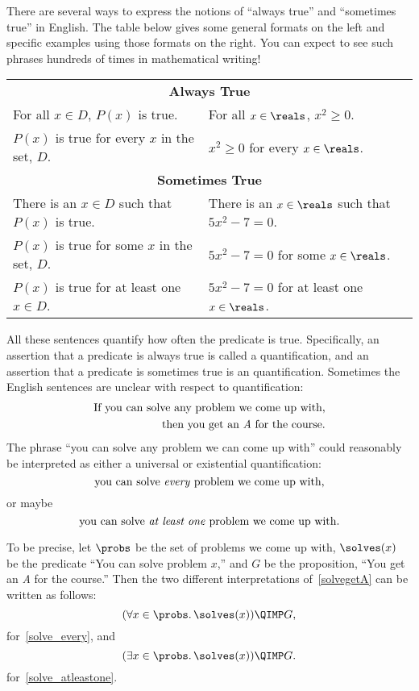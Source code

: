 There are several ways to express the notions of ``always true'' and
``sometimes true'' in English.  The table below gives some general
formats on the left and specific examples using those formats on the
right.  You can expect to see such phrases hundreds of times in
mathematical writing!
%
\begin{center}
\begin{tabular}{ll}
\multicolumn{2}{c}{\textbf{Always True}} \\[1ex]
For all $x \in D$, $P(x)$ is true. & For all $x \in \reals$, $x^2 \geq 0$. \\
$P(x)$ is true for every $x$ in the set, $D$. & $x^2 \geq 0$ for every $x \in \reals$. \\[2ex]
\multicolumn{2}{c}{\textbf{Sometimes True}} \\[1ex]
There is an $x \in D$ such that $P(x)$ is true. & There is an $x \in \reals$ such that $5x^2 - 7 = 0$.\\
$P(x)$ is true for some $x$ in the set, $D$. & $5x^2 - 7 = 0$ for some $x \in \reals$.\\
$P(x)$ is true for at least one $x \in D$. & $5x^2-7=0$ for at least one $x \in \reals$.
\end{tabular}
\end{center}

All these sentences quantify how often the predicate is true.
Specifically, an assertion that a predicate is always true is called a
 quantification, and an assertion that a predicate is
sometimes true is an  quantification.  Sometimes the
English sentences are unclear with respect to quantification:
%
\begin{align}
  \text{If you can solve any problem we come up with,}\notag\\
  \text{then you get an \emph{A} for the course.}\label{solvegetA}
\end{align}
%
The phrase ``you can solve any problem we can come up with'' could
reasonably be interpreted as either a universal or existential
quantification:
\begin{equation}\label{solve_every}
\text{you can solve \emph{every} problem we come up with,}
\end{equation}
or maybe
\begin{equation}\label{solve_atleastone}
\text{you can solve \emph{at least one} problem we come up with.}
\end{equation}

\iffalse
In any case, notice that this quantified phrase appears inside a
larger if-then statement.  This is quite normal; quantified statements
are themselves propositions and can be combined
with \QAND, \QOR, \QIMPLIES, etc., just like any other proposition.
\fi
To be precise, let $\probs$ be the set of problems we come up with,
$\solves(x)$ be the predicate ``You can solve problem $x$,'' and $G$
be the proposition, ``You get an \emph{A} for the course.''  Then the
two different interpretations of~\eqref{solvegetA}
can be written as follows:
%
\[
(\forall x \in \probs.\, \solves(x)) \QIMP G,
\]
for~\eqref{solve_every}, and
\[
(\exists x \in \probs.\, \solves(x)) \QIMP G.
\]
for~\eqref{solve_atleastone}.

